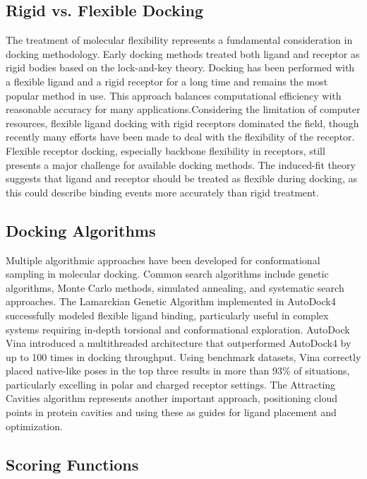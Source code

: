 \subsection{Rigid vs. Flexible Docking}
The treatment of molecular flexibility represents a fundamental consideration in docking methodology. Early docking methods treated both ligand and receptor as rigid bodies based on the lock-and-key theory. Docking has been performed with a flexible ligand and a rigid receptor for a long time and remains the most popular method in use. This approach balances computational efficiency with reasonable accuracy for many applications.Considering the limitation of computer resources, flexible ligand docking with rigid receptors dominated the field, though recently many efforts have been made to deal with the flexibility of the receptor. Flexible receptor docking, especially backbone flexibility in receptors, still presents a major challenge for available docking methods. The induced-fit theory suggests that ligand and receptor should be treated as flexible during docking, as this could describe binding events more accurately than rigid treatment\cite{CH1_18}.

\subsection{Docking Algorithms}
Multiple algorithmic approaches have been developed for conformational sampling in molecular docking. Common search algorithms include genetic algorithms, Monte Carlo methods, simulated annealing, and systematic search approaches. The Lamarckian Genetic Algorithm implemented in AutoDock4\cite{CH1_9} successfully modeled flexible ligand binding, particularly useful in complex systems requiring in-depth torsional and conformational exploration. AutoDock Vina\cite{CH1_19} introduced a multithreaded architecture that outperformed AutoDock4 by up to 100 times in docking throughput. Using benchmark datasets, Vina correctly placed native-like poses in the top three results in more than 93\% of situations, particularly excelling in polar and charged receptor settings. The Attracting Cavities algorithm represents another important approach, positioning cloud points in protein cavities and using these as guides for ligand placement and optimization.


\subsection{Scoring Functions}
